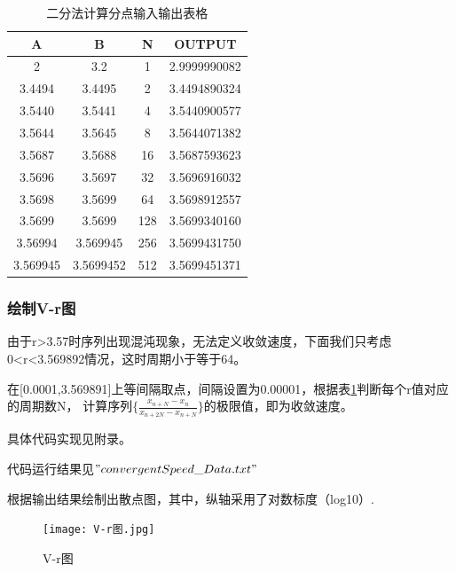 \documentclass[10pt, a4paper]{article}
\begin{document}
    \begin{table}[H]
        \centering
        \caption{二分法计算分点输入输出表格}
        \begin{tabular}{|c|c|c|c|}\hline
        A     & B     & N     & OUTPUT \\\hline
        2     & 3.2   & 1     & 2.9999990082 \\\hline
        3.4494 & 3.4495 & 2     & 3.4494890324 \\\hline
        3.5440 & 3.5441 & 4     & 3.5440900577 \\\hline
        3.5644 & 3.5645 & 8     & 3.5644071382 \\\hline
        3.5687 & 3.5688 & 16    & 3.5687593623 \\\hline
        3.5696 & 3.5697 & 32    & 3.5696916032 \\\hline
        3.5698 & 3.5699 & 64    & 3.5698912557 \\\hline
        3.5699 & 3.5699 & 128   & 3.5699340160 \\\hline
        3.56994 & 3.569945 & 256   & 3.5699431750 \\\hline
        3.569945 & 3.5699452 & 512   & 3.5699451371 \\\hline
        \end{tabular}%
        \label{二分法计算分点输入输出表格}%
    \end{table}%
    
    \subsubsection{绘制V-r图}

    由于r>3.57时序列出现混沌现象，无法定义收敛速度，下面我们只考虑0<r<3.569892情况，这时周期小于等于64。

    在[0.0001,3.569891]上等间隔取点，间隔设置为0.00001，根据表\ref{二分法计算分点输入输出表格}判断每个r值对应的周期数N，
    计算序列$\{\frac{x_{n+N}-x_n}{x_{n+2N}-x_{n+N}}\}$的极限值，即为收敛速度。

    具体代码实现见附录。

    代码运行结果见$"convergentSpeed\_Data.txt"$

    根据输出结果绘制出散点图，其中，纵轴采用了对数标度（log10）.

    \begin{figure}[H]
        \centering
        \texttt{[image: V-r图.jpg]}
        \caption{V-r图}\label{V-r图}
    \end{figure}
\end{document}

